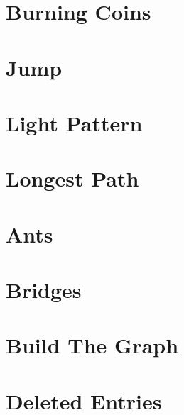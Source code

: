 \documentclass[a4paper, 10pt]{article}
\let\stdsection\section
\renewcommand\section{\newpage\stdsection}
\newcommand{\includecode}[1]{
    }
\newcommand{\algoAuthor}{2} %
\begin{document}
    
    \section{Burning Coins}
        \label{sec:burning_coins}
        \includecode{../problems/w03/Burning_Coins/BurningCoins\algoAuthor.cpp}
        
    \section{Jump}
        \label{sec:jump}
        \includecode{../problems/w03/Jump/Jump\algoAuthor.cpp}
        
    \section{Light Pattern}
        \label{sec:light_pattern}
        \includecode{../problems/w03/Light_Pattern/LightPattern\algoAuthor.cpp}
        
    \section{Longest Path}
        \label{sec:longest_path}
        \includecode{../problems/w03/Longest_Path/LongestPath\algoAuthor.cpp}
             
              
    \section{Ants}
        \label{sec:ants}
        \includecode{../problems/w04/Ants/Ants\algoAuthor.cpp}
        
    \section{Bridges}
        \label{sec:bridges}
        \includecode{../problems/w04/Bridges/Bridges\algoAuthor.cpp}
        
    \section{Build The Graph}
        \label{sec:build_the_graph}
        \includecode{../problems/w04/Build_The_Graph/BuildTheGraph\algoAuthor.cpp}
        
    \section{Deleted Entries}
        \label{sec:deleted_entries}
        \includecode{../problems/w04/Deleted_Entries/DeletedEntries\algoAuthor.cpp}
    
\end{document}
